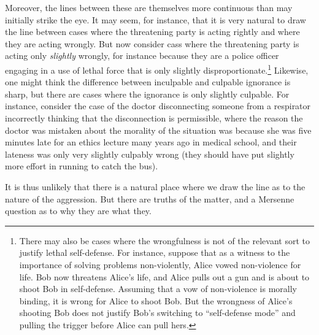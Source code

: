 Moreover, the lines between these are themselves more continuous than may initially strike the eye. It may seem, for instance,
that it is very natural to draw the line between cases where the threatening party is acting rightly and where they are
acting wrongly. But now consider cass where the threatening party is acting only \textit{slightly} wrongly, for instance 
because they are a police officer engaging in a use of lethal force that is only slightly disproportionate.\footnote{There may
also be cases where the wrongfulness is not of the relevant sort to justify lethal self-defense. For instance, suppose that 
as a witness to the importance of solving problems non-violently, Alice vowed non-violence for life. Bob now threatens Alice's 
life, and Alice pulls out a gun and is about to shoot Bob in self-defense. Assuming that a vow of non-violence is morally 
binding, it is wrong for Alice to shoot Bob. But the wrongness of Alice's shooting Bob does not justify Bob's switching 
to ``self-defense mode'' and pulling the trigger before Alice can pull hers.} Likewise, one might think the difference between
inculpable and culpable ignorance is sharp, but there are cases where the ignorance is only slightly culpable. For instance, 
consider the case of the doctor disconnecting someone from a respirator incorrectly thinking that the disconnection is permissible,
where the reason the doctor was mistaken about the morality of the situation was because she was five minutes late for an 
ethics lecture many years ago in medical school, and their lateness was only very slightly culpably wrong (they should have 
put slightly more effort in running to catch the bus). 

It is thus unlikely that there is a natural place where we draw the line as to the nature of the aggression. But there are
truths of the matter, and a Mersenne question as to why they are what they.

